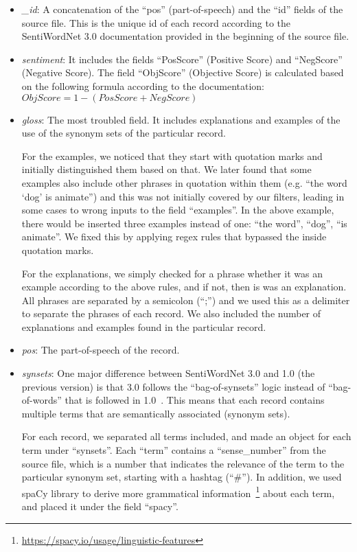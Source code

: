 \begin{itemize}
  \item \emph{\_id}: A concatenation of the ``pos'' (part-of-speech)
  and the ``id'' fields of the source file.
  This is the unique id of each record according to the SentiWordNet 3.0
  documentation provided in the beginning of the source file. 
  
  \item \emph{sentiment}: It includes the fields ``PosScore'' (Positive Score)
  and ``NegScore'' (Negative Score).
  The field ``ObjScore'' (Objective Score) is calculated
  based on the following formula according to the documentation: \\
  $ObjScore = 1 - (PosScore + NegScore)$
  
  \item \emph{gloss}: The most troubled field.
  It includes explanations and examples of the use of the synonym sets
  of the particular record.

  For the examples, we noticed that they start with quotation marks
  and initially distinguished them based on that.
  We later found that some examples also include other phrases 
  in quotation within them (e.g. ``the word `dog' is animate'')
  and this was not initially covered by our filters,
  leading in some cases to wrong inputs to the field ``examples''.
  In the above example, there would be inserted three examples
  instead of one: ``the word'', ``dog'', ``is animate''.
  We fixed this by applying regex rules
  that bypassed the inside quotation marks.

  For the explanations, we simply checked for a phrase
  whether it was an example according to the above rules,
  and if not, then is was an explanation.
  All phrases are separated by a semicolon (``;'')
  and we used this as a delimiter to separate the phrases
  of each record.
  We also included the number of explanations and examples
  found in the particular record.
  
  \item \emph{pos}: The part-of-speech of the record.
  
  \item \emph{synsets}: One major difference between SentiWordNet 3.0
  and 1.0 (the previous version) is
  that 3.0 follows the ``bag-of-synsets'' logic
  instead of ``bag-of-words'' that is followed in 1.0~\cite{BES10}.
  This means that each record contains multiple terms
  that are semantically associated (synonym sets).
  
  For each record, we separated all terms included,
  and made an object for each term under ``synsets''.
  Each ``term'' contains a ``sense\_number'' from the source file,
  which is a number that indicates the relevance of the term
  to the particular synonym set, starting with a hashtag (``\#'').
  In addition, we used spaCy library
  to derive more grammatical information~\footnote{\url {https://spacy.io/usage/linguistic-features}}
  about each term, and placed it under the field ``spacy''.
  

\end{itemize}

